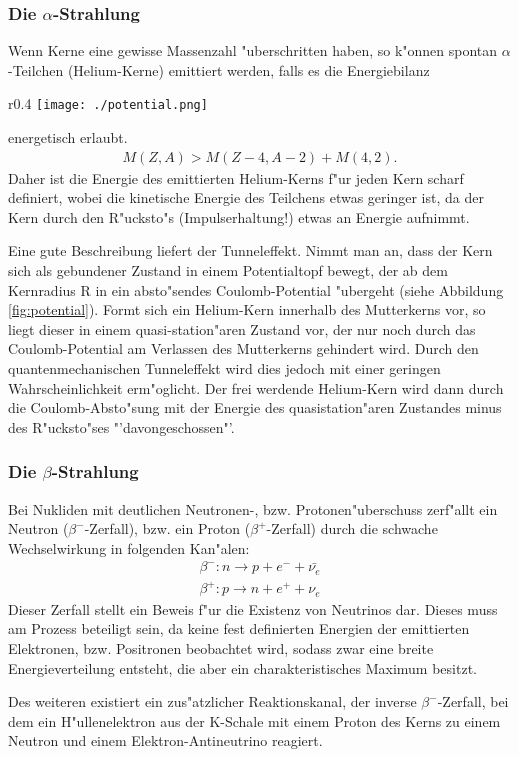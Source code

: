 \documentclass[12pt]{article}
\begin{document}
\subsubsection{Die $\alpha$-Strahlung}
Wenn Kerne eine gewisse Massenzahl "uberschritten haben, so k"onnen spontan $\alpha$-Teilchen (Helium-Kerne) emittiert werden, falls es die Energiebilanz 
\begin{wrapfigure}{r}{0.4\textwidth}
	\texttt{[image: ./potential.png]}
	\caption[Potential $\alpha$-Zerfall]{Kernpotential beim $\alpha$-Zerfall, gut zu sehen ist der quasistation"are Zustand des gebildeten He-Kernes \cite{povh}.}    
	\label{fig:potential}
\end{wrapfigure}
energetisch erlaubt.
\begin{align}
M(Z,A)>M(Z-4,A-2)+M(4,2).
\end{align}
Daher ist die Energie des emittierten Helium-Kerns f"ur jeden Kern scharf definiert, wobei die kinetische Energie des Teilchens etwas geringer ist, da der Kern durch den R"ucksto"s (Impulserhaltung!) etwas an Energie aufnimmt.\par
Eine gute Beschreibung liefert der Tunneleffekt. Nimmt man an, dass der Kern sich als gebundener Zustand in einem Potentialtopf bewegt, der ab dem Kernradius R in ein absto"sendes Coulomb-Potential "ubergeht (siehe Abbildung \ref{fig:potential}). Formt sich ein Helium-Kern innerhalb des Mutterkerns vor, so liegt dieser in einem quasi-station"aren Zustand vor, der nur noch durch das Coulomb-Potential am Verlassen des Mutterkerns gehindert wird. Durch den quantenmechanischen Tunneleffekt wird dies jedoch mit einer geringen Wahrscheinlichkeit erm"oglicht. Der frei werdende Helium-Kern wird dann durch die Coulomb-Absto"sung mit der Energie des quasistation"aren Zustandes minus des R"ucksto"ses "'davongeschossen"'.   
\subsubsection{Die $\beta$-Strahlung}   
Bei Nukliden mit deutlichen Neutronen-, bzw. Protonen"uberschuss zerf"allt ein Neutron ($\beta^{-}$-Zerfall), bzw. ein Proton ($\beta^{+}$-Zerfall) durch die schwache Wechselwirkung in folgenden Kan"alen:
\begin{align}
\beta^{-}: n\rightarrow p+e^{-}+\bar{\nu_{e}}\\
\beta^{+}: p\rightarrow n+e^{+}+\nu_{e}
\end{align}
Dieser Zerfall stellt ein Beweis f"ur die Existenz von Neutrinos dar. Dieses muss am Prozess beteiligt sein, da keine fest definierten Energien der emittierten Elektronen, bzw. Positronen beobachtet wird, sodass zwar eine breite Energieverteilung entsteht, die aber ein charakteristisches Maximum besitzt.\par 
Des weiteren existiert ein zus"atzlicher Reaktionskanal, der inverse $\beta^{-}$-Zerfall, bei dem ein H"ullenelektron aus der K-Schale mit einem Proton des Kerns zu einem Neutron und einem Elektron-Antineutrino reagiert. 
\end{document}
